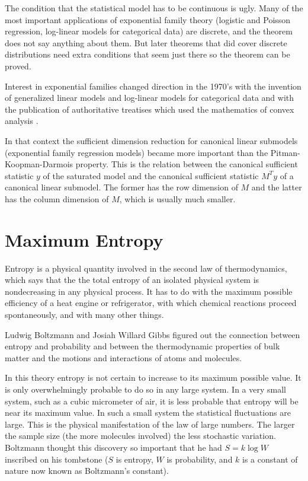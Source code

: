 \documentclass[12pt]{article}
\begin{document}
The condition that the statistical model has to be continuous is ugly. Many of the most important applications of exponential family theory (logistic and Poisson regression, log-linear models for categorical data) are discrete, and the theorem does not say anything about them. But later theorems that did cover discrete distributions need extra conditions that seem just there so the theorem can be proved. %

Interest in exponential families changed direction in the 1970’s with the invention of generalized linear models \citep{nelder1972generalized, wedderburn1974quasi} and log-linear models for categorical data \citep{bishop2007discrete} and with the publication of authoritative treatises \citep{barndorff2014information, brown1986fundamentals} which used the mathematics of convex analysis \citep{rockafellar1970convex}.

In that context the sufficient dimension reduction for canonical linear submodels (exponential family regression models) became more important than the Pitman-Koopman-Darmois property. This is the relation between the canonical sufficient statistic $y$ of the saturated model and the canonical sufficient statistic $M^Ty$ of a canonical linear submodel. The former has the row dimension of $M$ and the latter has the column dimension of $M$, which is usually much smaller.



\section*{Maximum Entropy}

Entropy is a physical quantity involved in the second law of thermodynamics, which says that the the total entropy of an isolated physical system is nondecreasing in any physical process. It has to do with the maximum possible efficiency of a heat engine or refrigerator, with which chemical reactions proceed spontaneously, and with many other things.

Ludwig Boltzmann and Josiah Willard Gibbs figured out the connection between entropy and probability and between the thermodynamic properties of bulk matter and the motions and interactions of atoms and molecules.

In this theory entropy is not certain to increase to its maximum possible value. It is only overwhelmingly probable to do so in any large system. In a very small system, such as a cubic micrometer of air, it is less probable that entropy will be near its maximum value. In such a small system the statistical fluctuations are large. This is the physical manifestation of the law of large numbers. The larger the sample size (the more molecules involved) the less stochastic variation. Boltzmann thought this discovery so important that he had $S = k\log W$ inscribed on his tombstone ($S$ is entropy, $W$ is probability, and $k$ is a constant of nature now known as Boltzmann’s constant).
\end{document}
